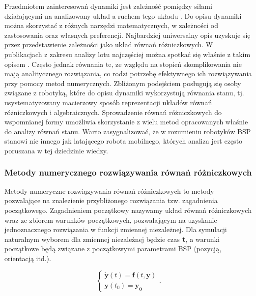 Przedmiotem zainteresowań dynamiki jest zależność pomiędzy siłami działającymi na analizowany układ a ruchem tego układu \cite{mw}.  Do opisu dynamiki można skorzystać z różnych narzędzi matematycznych, w zależności od zastosowania oraz własnych preferencji. Najbardziej uniwersalny opis uzyskuje się przez przedstawienie zależności jako układ równań różniczkowych. W publikacjach z zakresu analizy lotu najczęściej można spotkać się właśnie z takim opisem \cite{energies}\cite{quaterion}. Często jednak równania te, ze względu na stopień skomplikowania nie mają analitycznego rozwiązania, co rodzi potrzebę efektywnego ich rozwiązywania przy pomocy metod numerycznych. Zbliżonym podejściem posługują się osoby związane z robotyką, które do opisu dynamiki wykorzystują równania stanu, tj. usystematyzowany macierzowy sposób reprezentacji układów równań różniczkowych i algebraicznych. Sprowadzenie równań różniczkowych do wspomnianej formy umożliwia skorzystanie z wielu metod opracowanych właśnie do analizy równań stanu. Warto zasygnalizować, że w rozumieniu robotyków BSP stanowi nic innego jak latającego robota mobilnego, których analiza jest często poruszana w tej dziedzinie wiedzy.

\subsubsection{Metody numerycznego rozwiązywania równań różniczkowych}

Metody numeryczne rozwiązywania równań różniczkowych to metody pozwalające na znalezienie przybliżonego rozwiązania tzw. zagadnienia początkowego. Zagadnieniem początkowy nazywamy układ równań różniczkowych wraz ze zbiorem warunków początkowych, pozwalającym na uzyskanie jednoznacznego rozwiązania w funkcji zmiennej niezależnej. Dla symulacji naturalnym wyborem dla zmiennej niezależnej będzie czas \texttt{t}, a warunki początkowe będą związane z początkowymi parametrami BSP (pozycją, orientacją itd.).

\[
	\begin{cases}
		\dot{\bm{y}} \left( t \right)  = \bm{f} \left( t,\bm{y}\right) \\
		\bm{y} \left( t_0 \right) = \bm{y_0}
	\end{cases}.
\]

